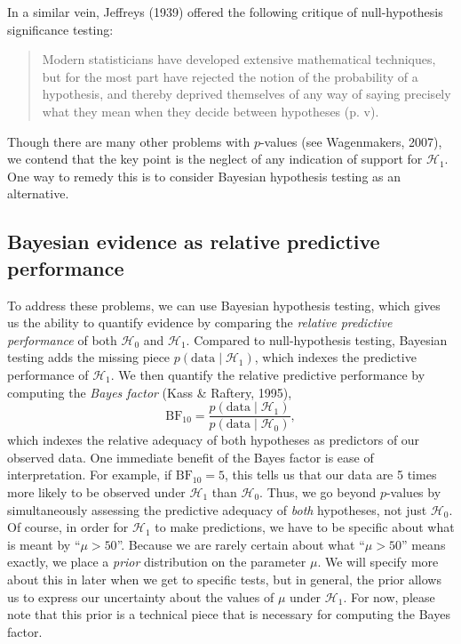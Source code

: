 \documentclass[english,,doc,floatsintext]{apa6}
\begin{document}
In a similar vein, Jeffreys (1939) offered the following critique of null-hypothesis significance testing:

\begin{quote}
Modern statisticians have developed extensive mathematical techniques, but for the most part have rejected the notion of the probability of a hypothesis, and thereby deprived themselves of any way of saying precisely what they mean when they decide between hypotheses (p. v).
\end{quote}

Though there are many other problems with \(p\)-values (see Wagenmakers, 2007), we contend that the key point is the neglect of any indication of support for \(\mathcal{H}_1\). One way to remedy this is to consider Bayesian hypothesis testing as an alternative.

\hypertarget{bayesian-evidence-as-relative-predictive-performance}{%
\subsection{Bayesian evidence as relative predictive performance}\label{bayesian-evidence-as-relative-predictive-performance}}

To address these problems, we can use Bayesian hypothesis testing, which gives us the ability to quantify evidence by comparing the \emph{relative predictive performance} of both \(\mathcal{H}_0\) and \(\mathcal{H}_1\). Compared to null-hypothesis testing, Bayesian testing adds the missing piece \(p(\text{data}\mid \mathcal{H}_1)\), which indexes the predictive performance of \(\mathcal{H}_1\). We then quantify the relative predictive performance by computing the \emph{Bayes factor} (Kass \& Raftery, 1995),
\[
\text{BF}_{10} = \frac{p(\text{data}\mid\mathcal{H}_1)}{p(\text{data}\mid\mathcal{H}_0)},
\]
which indexes the relative adequacy of both hypotheses as predictors of our observed data. One immediate benefit of the Bayes factor is ease of interpretation. For example, if \(\text{BF}_{10}=5\), this tells us that our data are 5 times more likely to be observed under \(\mathcal{H}_1\) than \(\mathcal{H}_0\). Thus, we go beyond \(p\)-values by simultaneously assessing the predictive adequacy of \emph{both} hypotheses, not just \(\mathcal{H}_0\). Of course, in order for \(\mathcal{H}_1\) to make predictions, we have to be specific about what is meant by \enquote{\(\mu>50\)}. Because we are rarely certain about what \enquote{\(\mu>50\)} means exactly, we place a \emph{prior} distribution on the parameter \(\mu\). We will specify more about this in later when we get to specific tests, but in general, the prior allows us to express our uncertainty about the values of \(\mu\) under \(\mathcal{H}_1\). For now, please note that this prior is a technical piece that is necessary for computing the Bayes factor.
\end{document}
